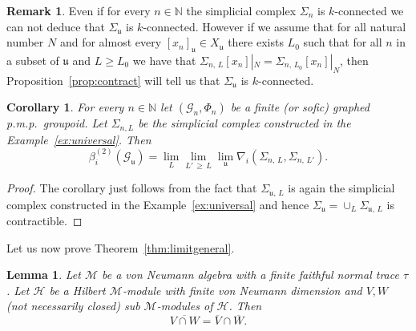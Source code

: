 \documentclass[10pt]{amsart}
\newtheorem{lemm}[cdrthm]{Lemma}
\newtheorem{coro}[cdrthm]{Corollary}
\theoremstyle{definition}
\newtheorem{rema}[cdrthm]{Remark}
\newcommand{\Nmath}{\mathbb{N}}
\newcommand{\cM}{\mathcal{M}}
\newcommand{\cH}{\mathcal{H}}
\newcommand{\cg}{\mathcal{G}}
\newcommand{\uu}{\mathfrak{u}}
\newcommand{\ul}{\mathfrak{u}}
\newcommand{\pmp}{p.m.p.\ }
\begin{document}
\begin{rema}
Even if for every $n\in\Nmath$ the simplicial complex $\Sigma_n$ is $k$-connected we can not deduce that $\Sigma_\ul$ is $k$-connected. However if we assume that for all natural number $N$ and for almost every $[x_n]_\ul\in X_\ul$ there exists $L_0$ such that for all $n$ in a subset of $\ul$ and $L\geq L_0$ we have that $\Sigma_{n,\,L}[x_n]|_N=\Sigma_{n,\,L_0}[x_n]|_N$, then Proposition~\ref{prop:contract} will tell us that $\Sigma_\ul$ is $k$-connected.
\end{rema}

\begin{coro}
For every $n\in\Nmath$ let $(\cg_n,\Phi_n)$ be a finite (or sofic) graphed \pmp groupoid. Let $\Sigma_{n,L}$ be the simplicial complex constructed in the Example~\ref{ex:universal}. Then
\[
\beta^{(2)}_i(\cg_\ul) = \lim_{L} \lim_{L'\,\geq\,L} \lim_\uu \nabla_i\left(\Sigma_{n,\,L},\Sigma_{n,\,L'}\right).
\]
\end{coro}
\begin{proof}
The corollary just follows from the fact that $\Sigma_{\ul,\,L}$ is again the simplicial complex constructed in the Example~\ref{ex:universal} and hence $\Sigma_\ul=\cup_L\Sigma_{\ul,\,L}$ is contractible.
\end{proof}

Let us now prove Theorem~\ref{thm:limitgeneral}.

\begin{lemm}\label{lem:vNdimension}
Let $\cM$ be a von Neumann algebra with a finite faithful normal trace $\tau$. Let $\cH$ be a Hilbert $\cM$-module with finite von Neumann dimension and $V,W$ (not necessarily closed) sub $\cM$-modules of $\cH$. Then
\[
\overline{V \cap W} = \overline{V} \cap \overline{W}.
\]
\end{lemm}
\end{document}
